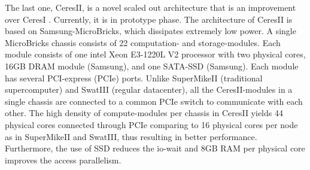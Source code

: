 \documentclass[conference]{IEEEtran}
\begin{document}
The last one, CeresII, is a novel scaled out architecture that is an improvement over CeresI \cite{Cluster:ceres1}. 
Currently, it is in prototype phase. 
The architecture of CeresII is based on Samsung-MicroBricks, which dissipates extremely low power.
A single MicroBricks chassis consists of 22 computation- and storage-modules.
Each module consists of one intel Xeon E3-1220L V2 processor with two physical cores, 16GB DRAM module (Samsung), and  one SATA-SSD (Samsung).
Each module has several PCI-express (PCIe) ports.
Unlike SuperMikeII (traditional supercomputer) and SwatIII (regular datacenter), all the CeresII-modules in a single chassis are connected to a common PCIe switch to communicate with each other.
The high density of compute-modules per chassis in CeresII yields 44 physical cores connected through PCIe comparing to 16 physical cores per node as in SuperMikeII and SwatIII, thus resulting in better performance.
Furthermore, the use of SSD reduces the io-wait and 8GB RAM per physical core improves the access parallelism.

\end{document}
